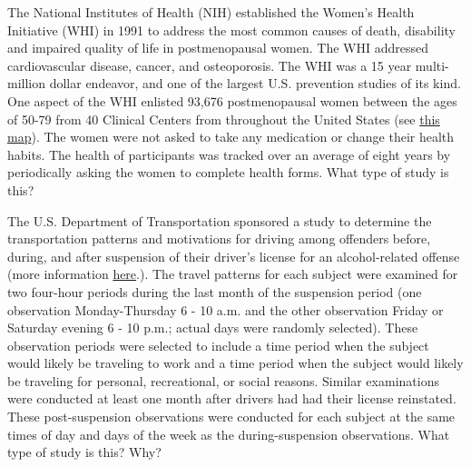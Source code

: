 \documentclass[10pt,openany]{book}\usepackage[]{graphicx}\usepackage[]{color}
\begin{document}
\vspace{-9pt}
\begin{exsection}
  \item \label{revex:ObsSWIH} The National Institutes of Health (NIH) established the Women's Health Initiative (WHI) in 1991 to address the most common causes of death, disability and impaired quality of life in postmenopausal women.  The WHI addressed cardiovascular disease, cancer, and osteoporosis.  The WHI was a 15 year multi-million dollar endeavor, and one of the largest U.S. prevention studies of its kind.  One aspect of the WHI enlisted 93,676 postmenopausal women between the ages of 50-79 from 40 Clinical Centers from throughout the United States (see \href{http://www.nhlbi.nih.gov/whi/whict.htm#map}{this map}).  The women were not asked to take any medication or change their health habits.  The health of participants was tracked over an average of eight years by periodically asking the women to complete health forms.  What type of study is this? 

  \item \label{revex:ObsSDOT} The U.S. Department of Transportation sponsored a study to determine the transportation patterns and motivations for driving among offenders before, during, and after suspension of their driver's license for an alcohol-related offense (more information \href{http://www.nhtsa.dot.gov/people/injury/research/observation_study/index.htm}{here}.).  The travel patterns for each subject were examined for two four-hour periods during the last month of the suspension period (one observation Monday-Thursday 6 - 10 a.m. and the other observation Friday or Saturday evening 6 - 10 p.m.; actual days were randomly selected).  These observation periods were selected to include a time period when the subject would likely be traveling to work and a time period when the subject would likely be traveling for personal, recreational, or social reasons.  Similar examinations were conducted at least one month after drivers had had their license reinstated. These post-suspension observations were conducted for each subject at the same times of day and days of the week as the during-suspension observations.  What type of study is this?  Why? 


\end{exsection}
\end{document}
